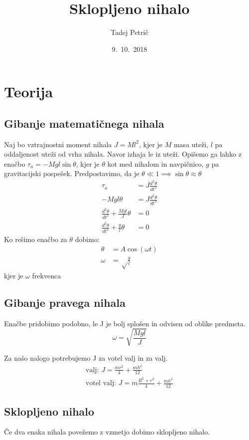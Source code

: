 \documentclass[a4paper]{article}
\begin{document}
\title{Sklopljeno nihalo}
\author{Tadej Petrič}
\date{9.\ 10.\ 2018}
\maketitle

\section{Teorija}
\subsection{Gibanje matematičnega nihala}
Naj bo vztrajnostni moment nihala $J = Ml^2$, kjer je $M$ masa uteži, $l$ pa oddaljenost uteži od vrha nihala. Navor izhaja le iz uteži. Opišemo ga lahko z enačbo $\tau_a = -Mgl\sin\theta$, kjer je $\theta$ kot med nihalom in navpičnico, $g$ pa gravitacijski pospešek. Predpostavimo, da je $\theta\ll1\implies \sin\theta \approx \theta$
\begin{align*}
  \tau_a &= J\frac{d^2\theta}{dt^2}\\
  -Mgl\theta &= J\frac{d^2\theta}{dt^2}\\
  \frac{d^2\theta}{dt^2}+\frac{Mgl}{J}\theta &= 0\\
  \frac{d^2\theta}{dt^2}+\frac{g}{l}\theta &= 0
\end{align*}
Ko rešimo enačbo za $\theta$ dobimo:
\begin{align*}
  \theta &= A\cos(\omega t)\\
  \omega &= \sqrt\frac{g}{l}
\end{align*}
kjer je $\omega$ frekvenca
\subsection{Gibanje pravega nihala}
 Enačbe pridobimo podobno, le J je bolj splošen in odvisen od oblike predmeta.
\[
\omega = \sqrt{\frac{Mgl}{J}}
\]

Za našo nalogo potrebujemo J za votel valj in za valj.
\begin{align*}
  \text{valj: }J = \frac{mr^2}{4}+\frac{mh^2}{12}\\
  \text{votel valj: }J = m\frac{R^2+r^2}{4} + \frac{mh^2}{12}
\end{align*}
\subsection{Sklopljeno nihalo}
Če dva enaka nihala povežemo z vzmetjo dobimo sklopljeno nihalo. 
\end{document}
